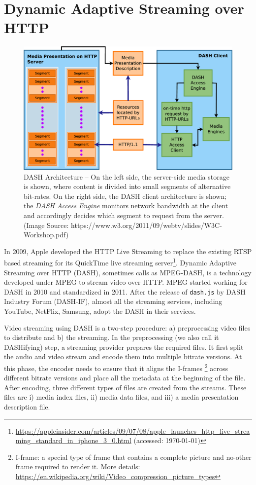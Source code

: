 \section{Dynamic Adaptive Streaming over HTTP}
\begin{figure}[!t]
	\centering
	\includegraphics[scale=0.15]{img/dash-arch}
	\caption{\small{DASH Architecture -- On the left side, the server-side media storage is shown, where content is divided into small segments of alternative bit-rates. On the right side, the DASH client architecture is shown; the {\it DASH Access Engine} monitors network bandwidth at the client and accordingly decides which segment to request from the server. (Image Source: https://www.w3.org/2011/09/webtv/slides/W3C-Workshop.pdf)}}
	\label{fig:dash}
\end{figure}
In 2009, Apple developed the HTTP Live Streaming to replace the existing RTSP based streaming for its QuickTime live streaming server\footnote{\url{https://appleinsider.com/articles/09/07/08/apple_launches_http_live_streaming_standard_in_iphone_3_0.html} (accessed: \today)}. Dynamic Adaptive Streaming over HTTP (DASH), sometimes calls as MPEG-DASH, is a technology developed under MPEG to stream video over HTTP. MPEG started working for DASH in 2010 and standardized in 2011\cite{ISO/IEC23009-1:2019}. After the release of {\tt dash.js} by DASH Industry Forum (DASH-IF), almost all the streaming services, including YouTube, NetFlix, Samsung, adopt the DASH in their services.

Video streaming using DASH is a two-step procedure: a) preprocessing video files to distribute and b) the streaming. In the preprocessing (we also call it DASHifying) step, a streaming provider prepares the required files. It first split the audio and video stream and encode them into multiple bitrate versions. At this phase, the encoder needs to ensure that it aligns the I-frames \footnote{I-frame: a special type of frame that contains a complete picture and no-other frame required to render it. More details: \url{https://en.wikipedia.org/wiki/Video_compression_picture_types}} across different bitrate versions and place all the metadata at the beginning of the file. After encoding, three different types of files are created from the streams. These files are i) media index files, ii) media data files, and iii) a media presentation description file.

